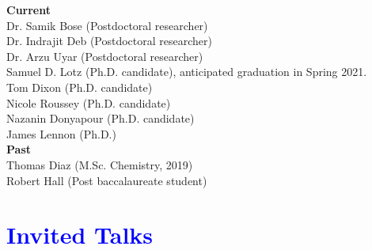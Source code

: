 \documentclass[margin,line]{res}
\begin{document}
\begin{resume}
{\bf Current}\\
Dr. Samik Bose (Postdoctoral researcher) \\
Dr. Indrajit Deb (Postdoctoral researcher) \\
Dr. Arzu Uyar (Postdoctoral researcher) \\
Samuel D. Lotz (Ph.D. candidate), anticipated graduation in Spring 2021. \\
Tom Dixon (Ph.D. candidate) \\
Nicole Roussey (Ph.D. candidate) \\
Nazanin Donyapour (Ph.D. candidate) \\
James Lennon (Ph.D.) \\

{\bf Past}\\
Thomas Diaz (M.Sc. Chemistry, 2019)\\
Robert Hall (Post baccalaureate student)\\

\section{\sc \textcolor{blue}{ Invited Talks }}


\end{resume}
\end{document}
